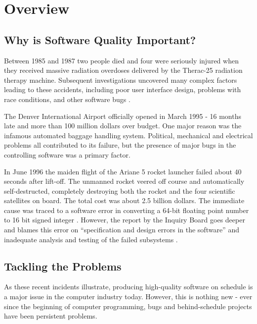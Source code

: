 \chapter{Overview}

\section{Why is Software Quality Important?}

Between 1985 and 1987 two people died and four were seriously injured when
they received massive radiation overdoses delivered by the Therac-25
radiation therapy machine.  Subsequent investigations uncovered many
complex factors leading to these accidents, including poor user interface
design, problems with race conditions, and other software bugs
\cite{Leveson93}.

The Denver International Airport officially opened in March 1995 - 16
months late and more than 100 million dollars over budget.  One major reason was
the infamous automated baggage handling system. Political, mechanical and
electrical problems all contributed to its failure, but the presence of
major bugs in the controlling software was a primary factor\cite{Glass98}.

In June 1996 the maiden flight of the Ariane 5 rocket launcher failed about
40 seconds after lift-off.  The unmanned rocket veered off course and
automatically self-destructed, completely destroying both the rocket and
the four scientific satellites on board. The total cost was about 2.5
billion dollars.  The immediate cause was traced to a software error in
converting a 64-bit floating point number to 16 bit signed integer
\cite{Jezequel97}. However, the report by the Inquiry Board goes deeper and
blames this error on ``specification and design errors in the software''
and inadequate analysis and testing of the failed subsystems
\cite{Flight501}.

\section{Tackling the Problems}     

As these recent incidents illustrate, producing high-quality software on
schedule is a major issue in the computer industry today. However, this is
nothing new - ever since the beginning of computer programming, bugs and
behind-schedule projects have been persistent problems.

